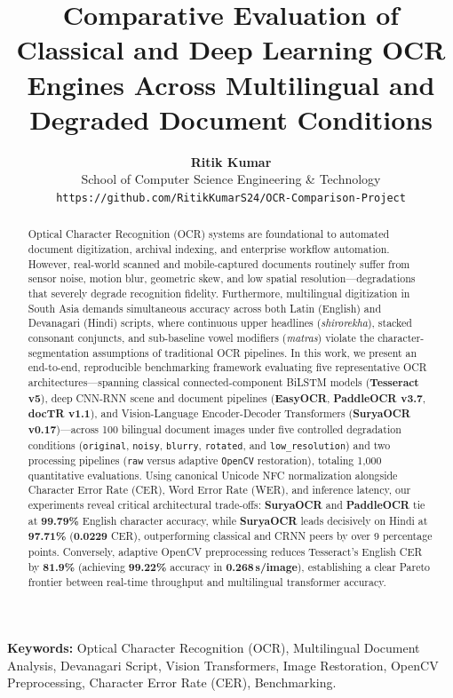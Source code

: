 \documentclass[11pt,a4paper]{article}
\title{\textbf{Comparative Evaluation of Classical and Deep Learning OCR Engines Across Multilingual and Degraded Document Conditions}}
\author{
    \textbf{Ritik Kumar} \\
    School of Computer Science Engineering \& Technology \\
    \texttt{https://github.com/RitikKumarS24/OCR-Comparison-Project}
}
\date{}
\begin{document}
\maketitle

\begin{abstract}
Optical Character Recognition (OCR) systems are foundational to automated document digitization, archival indexing, and enterprise workflow automation. However, real-world scanned and mobile-captured documents routinely suffer from sensor noise, motion blur, geometric skew, and low spatial resolution—degradations that severely degrade recognition fidelity. Furthermore, multilingual digitization in South Asia demands simultaneous accuracy across both Latin (English) and Devanagari (Hindi) scripts, where continuous upper headlines (\textit{shirorekha}), stacked consonant conjuncts, and sub-baseline vowel modifiers (\textit{matras}) violate the character-segmentation assumptions of traditional OCR pipelines. In this work, we present an end-to-end, reproducible benchmarking framework evaluating five representative OCR architectures—spanning classical connected-component BiLSTM models (\textbf{Tesseract v5}), deep CNN-RNN scene and document pipelines (\textbf{EasyOCR}, \textbf{PaddleOCR v3.7}, \textbf{docTR v1.1}), and Vision-Language Encoder-Decoder Transformers (\textbf{SuryaOCR v0.17})—across 100 bilingual document images under five controlled degradation conditions (\texttt{original}, \texttt{noisy}, \texttt{blurry}, \texttt{rotated}, and \texttt{low\_resolution}) and two processing pipelines (\texttt{raw} versus adaptive \texttt{OpenCV} restoration), totaling 1,000 quantitative evaluations. Using canonical Unicode NFC normalization alongside Character Error Rate (CER), Word Error Rate (WER), and inference latency, our experiments reveal critical architectural trade-offs: \textbf{SuryaOCR} and \textbf{PaddleOCR} tie at \textbf{99.79\%} English character accuracy, while \textbf{SuryaOCR} leads decisively on Hindi at \textbf{97.71\%} (\textbf{0.0229} CER), outperforming classical and CRNN peers by over 9 percentage points. Conversely, adaptive OpenCV preprocessing reduces Tesseract's English CER by \textbf{81.9\%} (achieving \textbf{99.22\%} accuracy in \textbf{0.268\,s/image}), establishing a clear Pareto frontier between real-time throughput and multilingual transformer accuracy.
\end{abstract}

\textbf{Keywords:} Optical Character Recognition (OCR), Multilingual Document Analysis, Devanagari Script, Vision Transformers, Image Restoration, OpenCV Preprocessing, Character Error Rate (CER), Benchmarking.
\end{document}
